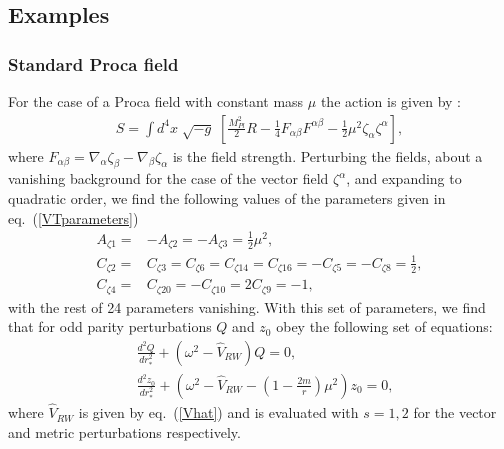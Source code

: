 \documentclass[10pt,twocolumn,preprintnumbers,amsmath,amssymb,nofootinbib
,superscriptaddress]{revtex4-1}
\begin{document}
{{{\subsection{Examples}
\subsubsection{Standard Proca field}\label{procaexample}
For the case of a Proca field with constant mass $\mu$ the action is given by \cite{2017JCAP...08..024H}:
\begin{align}
S=\int d^4x\;\sqrt{-g}\;\left[\frac{M_{Pl}^2}{2}R-\frac{1}{4}F_{\alpha\beta}F^{\alpha\beta}-\frac{1}{2}\mu^2\zeta_\alpha \zeta^\alpha\right],
\end{align}
where $F_{\alpha\beta}=\nabla_\alpha \zeta_\beta-\nabla_\beta \zeta_\alpha$ is the field strength. Perturbing the fields, about a vanishing background for the case of the vector field $\zeta^\alpha$, and expanding to quadratic order, we find the following values of the parameters given in eq.~(\ref{VTparameters})
\begin{align}
A_{\zeta1}=&-A_{\zeta2}=-A_{\zeta3}=\frac{1}{2}\mu^2,\nonumber\\
C_{\zeta2}=&C_{\zeta3}=C_{\zeta6}=C_{\zeta14}=C_{\zeta16}=-C_{\zeta5}=-C_{\zeta8}=\frac{1}{2},\nonumber\\
C_{\zeta4}=&C_{\zeta20}=-C_{\zeta10}=2C_{\zeta9}=-1,
\end{align}
with the rest of 24 parameters vanishing.
With this set of parameters, we find that for odd parity perturbations $Q$ and $z_0$ obey the following set of equations:
\begin{align}
&\frac{d^2Q}{dr_\ast^2}+\left(\omega^2-\hat{V}_{RW}\right)Q=0,\nonumber\\
&\frac{d^2z_0}{dr_\ast^2}+\left(\omega^2-\hat{V}_{RW}-\left(1-\frac{2m}{r}\right)\mu^2\right)z_0=0,\label{EOModdproca}
\end{align}
where $\hat{V}_{RW}$ is given by eq.~(\ref{Vhat}) and is evaluated with $s=1,2$ for the vector and metric perturbations respectively. 

}}}
\end{document}
